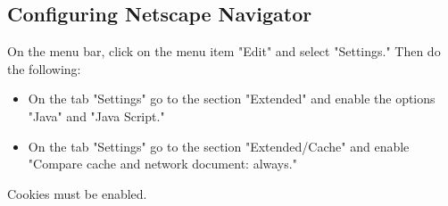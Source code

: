 \subsection{Configuring Netscape Navigator}

On the menu bar, click on the menu item "Edit" and select "Settings." 
Then do the following: 
\begin{itemize}
\item On the tab "Settings" go to the section "Extended" and enable the options "Java" and "Java 
  Script." 
\item On the tab "Settings" go to the section "Extended/Cache" and enable "Compare cache and 
  network document: always." 
\end{itemize}
Cookies must be enabled.